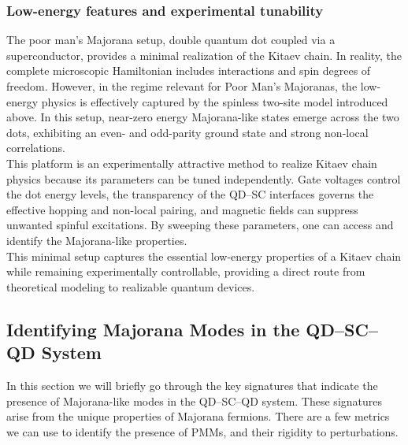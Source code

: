 \documentclass[11pt, letterpaper, titlepage]{article}
\begin{document}
\subsubsection{Low-energy features and experimental tunability}
The poor man's Majorana setup, double quantum dot coupled via a superconductor, provides a minimal realization of the Kitaev chain. In reality, the complete microscopic Hamiltonian includes interactions and spin degrees of freedom. However, in the regime relevant for Poor Man's Majoranas, the low-energy physics is effectively captured by the spinless two-site model introduced above. In this setup, near-zero energy Majorana-like states emerge across the two dots, exhibiting an even- and odd-parity ground state and strong non-local correlations.\\
This platform is an experimentally attractive method to realize Kitaev chain physics because its parameters can be tuned independently. Gate voltages control the dot energy levels, the transparency of the QD–SC interfaces governs the effective hopping and non-local pairing, and magnetic fields can suppress unwanted spinful excitations. By sweeping these parameters, one can access and identify the  Majorana-like properties. \\
This minimal setup captures the essential low-energy properties of a Kitaev chain while remaining experimentally controllable, providing a direct route from theoretical modeling to realizable quantum devices.
\subsection{Identifying Majorana Modes in the QD–SC–QD System}\label{sec:IdentifyingMajoranaModes}
In this section we will briefly go through the key signatures that indicate the presence of Majorana-like modes in the QD–SC–QD system. These signatures arise from the unique properties of Majorana fermions. There are a few metrics we can use to identify the presence of PMMs, and their rigidity to perturbations.\\
\end{document}
